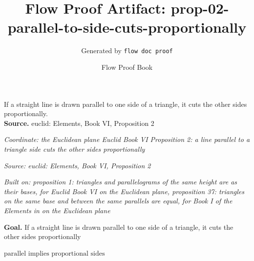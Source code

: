 \documentclass[11pt]{article}
\title{Flow Proof Artifact: prop-02-parallel-to-side-cuts-proportionally}
\author{Generated by \texttt{flow doc proof}}
\date{Flow Proof Book}
\theoremstyle{definition}
\begin{document}
\maketitle
If a straight line is drawn parallel to one side of a triangle, it cuts the other sides proportionally.\\[0.5em]
\textbf{Source.} euclid: Elements, Book VI, Proposition 2\\[0.5em]
\bigskip
{}\par
\smallskip\noindent\textit{Coordinate: the Euclidean plane \cdot Euclid Book VI \cdot Proposition 2: a line parallel to a triangle side cuts the other sides proportionally}\par
\smallskip\noindent\textit{Source: euclid: Elements, Book VI, Proposition 2}\par
\smallskip\noindent\textit{Built on: proposition 1: triangles and parallelograms of the same height are as their bases, for Euclid Book VI on the Euclidean plane, proposition 37: triangles on the same base and between the same parallels are equal, for Book I of the Elements in on the Euclidean plane}\par
\medskip
\noindent\textbf{Goal.} If a straight line is drawn parallel to one side of a triangle, it cuts the other sides proportionally\par
\noindent$\displaystyle \text{parallel implies proportional sides}$\par
\medskip
\noindent
\end{document}
